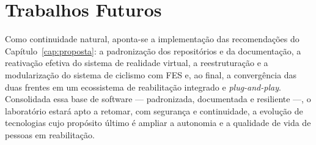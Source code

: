 \section{Trabalhos Futuros}
\label{sec:trabalhos-futuros}

Como continuidade natural, aponta-se a implementação das recomendações do
Capítulo~\ref{cap:proposta}: a padronização dos repositórios e da documentação, a
reativação efetiva do sistema de realidade virtual, a reestruturação e a modularização do
sistema de ciclismo com FES e, ao final, a convergência das duas frentes em um ecossistema de
reabilitação integrado e \emph{plug-and-play}. Consolidada essa base de software ---
padronizada, documentada e resiliente ---, o laboratório estará apto a retomar, com
segurança e continuidade, a evolução de tecnologias cujo propósito último é ampliar a
autonomia e a qualidade de vida de pessoas em reabilitação.
